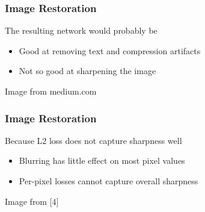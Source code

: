 \documentclass[xetex,professionalfont]{beamer}
\begin{document}
\begin{frame}
	\frametitle{Image Restoration}

	The resulting network would probably be
	\begin{itemize}
		\item Good at removing text and compression artifacts
		\item Not so good at sharpening the image
	\end{itemize}

	\medskip

	\begin{center}
		{\centering Image from medium.com}
	\end{center}

\end{frame}


\begin{frame}
	\frametitle{Image Restoration}

	Because L2 loss does not capture sharpness well
	\begin{itemize}
		\item Blurring has little effect on most pixel values
		\item Per-pixel losses cannot capture overall sharpness
	\end{itemize}

	\medskip

	\begin{center}
		{\centering Image from [4]}
	\end{center}

\end{frame}
\end{document}
